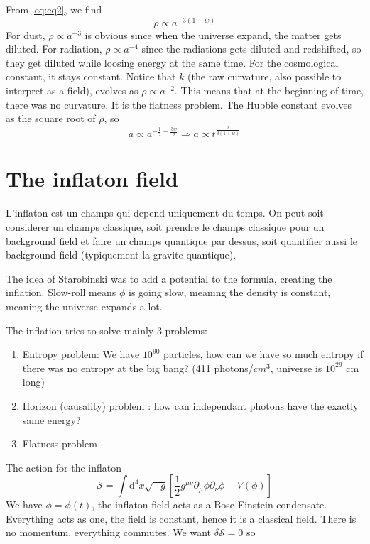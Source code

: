 \documentclass[a4paper]{book}
\theoremstyle{definition}
\theoremstyle{remark}
\begin{document}
From \eqref{eq:eq2}, we find 
\begin{equation}
    \rho \propto a^{-3(1 + w)}
\end{equation}
For dust, $\rho \propto a^{-3}$ is obvious since when the universe expand, the matter gets diluted. For radiation, $\rho \propto a^{-4}$ since the radiations gets diluted and redshifted, so they get diluted while loosing energy at the same time. For the cosmological constant, it stays constant. Notice that $k$ (the raw curvature, also possible to interpret as a field), evolves as $\rho \propto a^{-2}$. This means that at the beginning of time, there was no curvature. It is the flatness problem. The Hubble constant evolves as the square root of $\rho$, so 
\begin{equation}
    \dot a \propto a^{-\frac{1}{2} - \frac{3w}{2}} \Rightarrow a \propto t^{\frac{2}{3(1 + w)}}
\end{equation}
\chapter{The inflaton field}

L'inflaton est un champs qui depend uniquement du temps. On peut soit considerer un champs classique, soit prendre le champs classique pour un background field et faire un champs quantique par dessus, soit quantifier aussi le background field (typiquement la gravite quantique). \par \medskip 

The idea of Starobinski was to add a potential to the formula, creating the inflation. Slow-roll means $\phi$ is going slow, meaning the density is constant, meaning the universe expands a lot. \par \medskip 

The inflation tries to solve mainly 3 problems:
\begin{enumerate}
    \item Entropy problem: We have $10^90$ particles, how can we have so much entropy if there was no entropy at the big bang? (411 photons/$cm^3$, universe is $10^{29}$ cm long)
    \item Horizon (causality) problem : how can independant photons have the exactly same energy?
    \item Flatness problem
\end{enumerate}
The action for the inflaton
\begin{equation}
    \mathcal S = \int \text{d}^4 x \sqrt{-g}\left[\frac{1}{2}g^{\mu\nu} \partial_\mu \phi \partial_\nu \phi - V(\phi)\right]
\end{equation}
We have $\phi = \phi(t)$, the inflaton field acts as a Bose Einstein condensate. Everything acts as one, the field is constant, hence it is a classical field. There is no momentum, everything commutes. We want $\delta \mathcal S = 0$ so 
\end{document}
